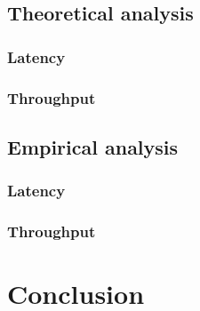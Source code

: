 \documentclass[a4paper]{article}
\begin{document}
\subsection{Theoretical analysis}

\subsubsection*{Latency}

\subsubsection*{Throughput}

\subsection{Empirical analysis}

\subsubsection*{Latency}

\subsubsection*{Throughput}

\section*{Conclusion}
\end{document}
